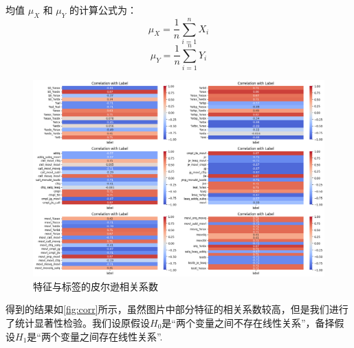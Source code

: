 均值 \(\mu_X\) 和 \(\mu_Y\) 的计算公式为：
\begin{equation}
\mu_X = \frac{1}{n} \sum_{i=1}^{n} X_i
\label{eq:mean_x}
\end{equation}
\begin{equation}
\mu_Y = \frac{1}{n} \sum_{i=1}^{n} Y_i
\label{eq:mean_y}
\end{equation}

  \begin{figure}[H]
      \centering
      \includegraphics[width=1\linewidth]{figures/corr.png}
      \caption{特征与标签的皮尔逊相关系数}
      \label{fig:corr}
  \end{figure}
得到的结果如\autoref{fig:corr}所示，虽然图片中部分特征的相关系数较高，但是我们进行了统计显著性检验。我们设原假设$H_0$是“两个变量之间不存在线性关系”，备择假设$H_1$是“两个变量之间存在线性关系”.

